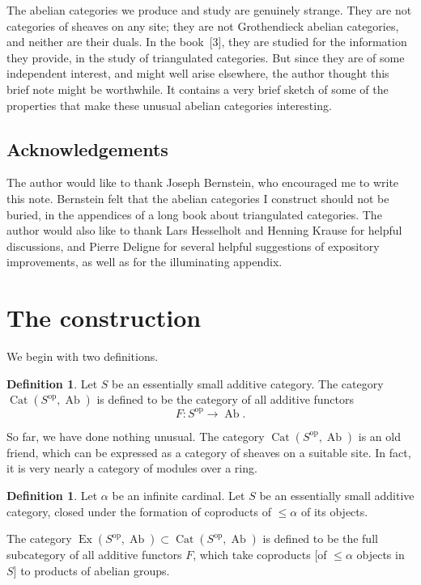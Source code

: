 \documentclass[11pt,a4paper]{article}
\theoremstyle{plain}
\theoremstyle{definition}
\newtheorem{definition}[theorem]{Definition}
\DeclareMathOperator{\Cat}{Cat}
\DeclareMathOperator{\Ex}{Ex}
\DeclareMathOperator{\Ab}{Ab}
\newcommand{\op}{\mathrm{op}}
\numberwithin{equation}{section}
\begin{document}
The abelian categories we produce and study are genuinely strange. They are not categories of sheaves on any site; they are not Grothendieck abelian categories, and neither are their duals. In the book~[3], they are studied for the information they provide, in the study of triangulated categories. But since they are of some independent interest, and might well arise elsewhere, the author thought this brief note might be worthwhile. It contains a very brief sketch of some of the properties that make these unusual abelian categories interesting.

\subsection*{Acknowledgements}

The author would like to thank Joseph Bernstein, who encouraged me to write this note. Bernstein felt that the abelian categories I construct should not be buried, in the appendices of a long book about triangulated categories. The author would also like to thank Lars Hesselholt and Henning Krause for helpful discussions, and Pierre Deligne for several helpful suggestions of expository improvements, as well as for the illuminating appendix.


\section{The construction}

We begin with two definitions.

\begin{definition}\label{def1.1}
Let $S$ be an essentially small additive category. The category $\Cat(S^{\op},\Ab)$ is defined to be the category of all additive functors
\begin{equation*}
F: S^{\op} \longrightarrow \Ab.
\end{equation*}
\end{definition}

So far, we have done nothing unusual. The category $\Cat(S^{\op},\Ab)$ is an old friend, which can be expressed as a category of sheaves on a suitable site. In fact, it is very nearly a category of modules over a ring.

\begin{definition}\label{def1.2}
Let $\alpha$ be an infinite cardinal. Let $S$ be an essentially small additive category, closed under the formation of coproducts of $\leq\alpha$ of its objects.

The category $\Ex(S^{\op},\Ab) \subset \Cat(S^{\op},\Ab)$ is defined to be the full subcategory of all additive functors $F$, which take coproducts [of $\leq\alpha$ objects in $S$] to products of abelian groups.
\end{definition}
\end{document}
